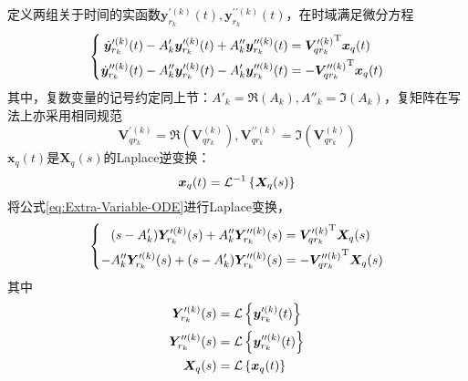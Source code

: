 \noindent 定义两组关于时间的实函数$\boldsymbol{y}_{r_k}^{\prime(k)}(t), \boldsymbol{y}_{r_k}^{\prime\prime(k)}(t)$，在时域满足微分方程
\begin{equation}
  \label{eq:Extra-Variable-ODE}
  \left\{
  \begin{aligned}
    \dot{\boldsymbol{y}}_{r_k}^{\prime(k)}(t)- A'_k\boldsymbol{y}_{r_k}^{\prime(k)}(t)+A''_k\boldsymbol{y}_{r_k}^{\prime\prime(k)}(t)       & = {\boldsymbol{V}_{qr_k}^{\prime(k)}}^{\mathrm{T}} \boldsymbol{x}_{q}(t)        \\
    \dot{\boldsymbol{y}}_{r_k}^{\prime\prime(k)}(t)-A''_k \boldsymbol{y}_{r_k}^{\prime(k)}(t)-A'_k\boldsymbol{y}_{r_k}^{\prime\prime(k)}(t) & = -{\boldsymbol{V}_{qr_k}^{\prime\prime(k)}}^{\mathrm{T}} \boldsymbol{x}_{q}(t)
  \end{aligned} \right.
\end{equation}
其中，复数变量的记号约定同上节：$A'_k=\Re(A_k),A''_k=\Im(A_k)$，复矩阵在写法上亦采用相同规范
\begin{displaymath}
  \boldsymbol{V}_{qr_k}^{\prime(k)}=\Re(\boldsymbol{V}_{qr_k}^{(k)}), \boldsymbol{V}_{qr_k}^{\prime\prime(k)}=\Im(\boldsymbol{V}_{qr_k}^{(k)})
\end{displaymath}
$\boldsymbol{x}_q(t)$是$\boldsymbol{X}_q(s)$的Laplace逆变换：
\begin{displaymath}
  \boldsymbol{x}_q(t)=\mathcal{L}^{-1} \left\{ {\boldsymbol{X}_q(s)} \right\}
\end{displaymath}
将公式\eqref{eq:Extra-Variable-ODE}进行Laplace变换，
\begin{equation}
  \label{eq:Extra-Variable-Laplace}
  \left\{
  \begin{aligned}
    (s-A'_k)\boldsymbol{Y}_{r_k}^{\prime(k)}(s)+ A''_k\boldsymbol{Y}_{r_k}^{\prime\prime(k)}(s)  & ={\boldsymbol{V}_{qr_k}^{\prime(k)}}^{\mathrm{T}}\boldsymbol{X}_q(s)         \\
    -A''_k\boldsymbol{Y}_{r_k}^{\prime(k)}(s)+ (s-A'_k)\boldsymbol{Y}_{r_k}^{\prime\prime(k)}(s) & = -{\boldsymbol{V}_{qr_k}^{\prime\prime(k)}}^{\mathrm{T}}\boldsymbol{X}_q(s)
  \end{aligned} \right.
\end{equation}
其中
\begin{align}
  \boldsymbol{Y}_{r_k}^{\prime(k)}(s)       & =\mathcal{L} \left\{ {\boldsymbol{y}_{r_k}^{\prime(k)}(t)} \right\} \nonumber       \\
  \boldsymbol{Y}_{r_k}^{\prime\prime(k)}(s) & =\mathcal{L} \left\{ {\boldsymbol{y}_{r_k}^{\prime\prime(k)}(t)} \right\} \nonumber \\
  \boldsymbol{X}_q(s)                       & = \mathcal{L} \left\{ {\boldsymbol{x}_q(t)} \right\} \nonumber
\end{align}

